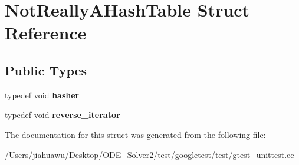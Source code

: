 \hypertarget{struct_not_really_a_hash_table}{}\section{Not\+Really\+A\+Hash\+Table Struct Reference}
\label{struct_not_really_a_hash_table}
\subsection*{Public Types}
\begin{DoxyCompactItemize}
\item 
\mbox{\label{struct_not_really_a_hash_table_a0206bef6150919c8ba5d539d5bf555f7}} 
typedef void {\bfseries hasher}
\item 
\mbox{\label{struct_not_really_a_hash_table_a8dbee2a2a80768191c736fb57367cfe7}} 
typedef void {\bfseries reverse\+\_\+iterator}
\end{DoxyCompactItemize}


The documentation for this struct was generated from the following file\+:\begin{DoxyCompactItemize}
\item 
/\+Users/jiahuawu/\+Desktop/\+O\+D\+E\+\_\+\+Solver2/test/googletest/test/gtest\+\_\+unittest.\+cc\end{DoxyCompactItemize}
